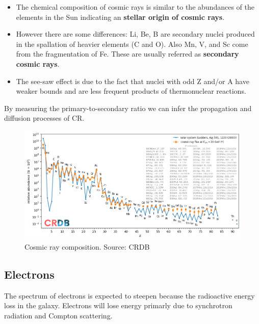 \documentclass[
  letterpaper,
  DIV=11,
  numbers=noendperiod]{scrreprt}
\providecommand{\tightlist}{%
  \setlength{\itemsep}{0pt}\setlength{\parskip}{0pt}}\usepackage{longtable,booktabs,array}
\begin{document}
\begin{itemize}
\tightlist
\item
  The chemical composition of cosmic rays is similar to the abundances
  of the elements in the Sun indicating an \textbf{stellar origin of
  cosmic rays}.
\item
  However there are some differences: Li, Be, B are secondary nuclei
  produced in the spallation of heavier elements (C and O). Also Mn, V,
  and Sc come from the fragmentation of Fe. These are usually referred
  as \textbf{secondary cosmic rays}.
\item
  The see-saw effect is due to the fact that nuclei with odd Z and/or A
  have weaker bounds and are less frequent products of thermonuclear
  reactions.
\end{itemize}

By measuring the primary-to-secondary ratio we can infer the propagation
and diffusion processes of CR.

\begin{figure}[H]

{\centering \includegraphics{images/composition_2.png}

}

\caption{Cosmic ray composition. Source: CRDB}

\end{figure}%

\subsection*{Electrons}\label{electrons}

The spectrum of electrons is expected to steepen because the radioactive
energy loss in the galaxy. Electrons will lose energy primarly due to
synchrotron radiation and Compton scattering.
\end{document}
